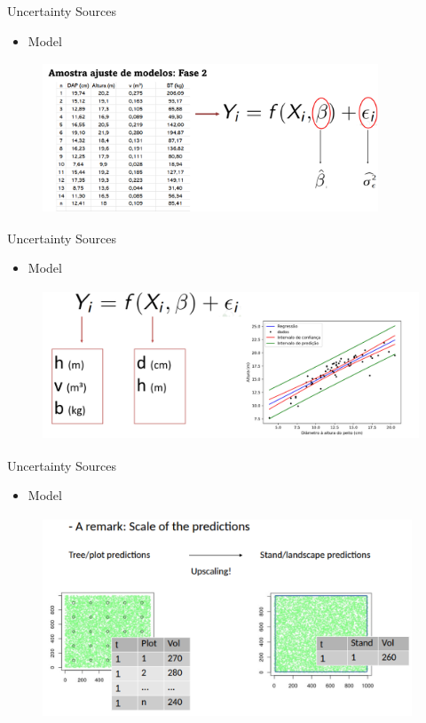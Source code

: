 \documentclass{beamer}
\begin{document}
\begin{frame} {Uncertainty Sources} 
\begin{itemize}
    \item Model
\end{itemize}
\begin{figure}
        \centering
        \includegraphics[width = 10cm, height = 4.5cm]{pic/sumodel.jpg}
        \end{figure} 
\end{frame}

\begin{frame} {Uncertainty Sources} 
\begin{itemize}
    \item Model
\end{itemize}
\begin{figure}
        \centering
        \includegraphics[width = 12cm, height = 4.5cm]{pic/suncertainty1.jpg}
        \end{figure} 
\end{frame}

\begin{frame} {Uncertainty Sources} 
\begin{itemize}
    \item Model
    \end{itemize}
\begin{figure}
        \centering
        \includegraphics[width = 11cm, height = 6cm]{pic/sources.png}
        \end{figure} 
\end{frame}
\end{document}
